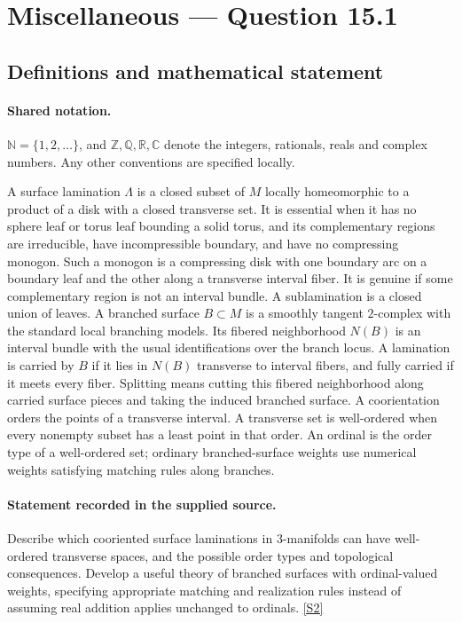 \documentclass[11pt]{article}
\newcommand{\sref}[2]{\hyperlink{source:#1:#2}{[S#2]}}
\begin{document}
\section{Miscellaneous — Question 15.1}\label{statement}

\subsection{Definitions and mathematical statement}

\paragraph{Shared notation.}$\mathbb N=\{1,2,\ldots\}$, and $\mathbb Z,\mathbb Q,\mathbb R,\mathbb C$ denote the integers, rationals, reals and complex numbers. Any other conventions are specified locally.


A surface lamination $\Lambda$ is a closed subset of $M$ locally homeomorphic to a product of a disk with a closed transverse set. It is essential when it has no sphere leaf or torus leaf bounding a solid torus, and its complementary regions are irreducible, have incompressible boundary, and have no compressing monogon. Such a monogon is a compressing disk with one boundary arc on a boundary leaf and the other along a transverse interval fiber. It is genuine if some complementary region is not an interval bundle. A sublamination is a closed union of leaves. A branched surface $B\subset M$ is a smoothly tangent $2$-complex with the standard local branching models. Its fibered neighborhood $N(B)$ is an interval bundle with the usual identifications over the branch locus. A lamination is carried by $B$ if it lies in $N(B)$ transverse to interval fibers, and fully carried if it meets every fiber. Splitting means cutting this fibered neighborhood along carried surface pieces and taking the induced branched surface. A coorientation orders the points of a transverse interval. A transverse set is well-ordered when every nonempty subset has a least point in that order. An ordinal is the order type of a well-ordered set; ordinary branched-surface weights use numerical weights satisfying matching rules along branches.
\paragraph{Statement recorded in the supplied source.}
Describe which cooriented surface laminations in $3$-manifolds can have well-ordered transverse spaces, and the possible order types and topological consequences. Develop a useful theory of branched surfaces with ordinal-valued weights, specifying appropriate matching and realization rules instead of assuming real addition applies unchanged to ordinals. \sref{statement}{2}
\end{document}
